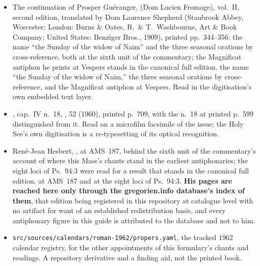 \begin{itemize}
\& Washbourne, 1927), printed pp.~139--141,
\ifdefined\TriptychSynthesisEdition
for the Lawrence reckoning at the sixth unit of the commentary and the Lenten
identities of the Gradual, the Offertory and the Communion in the
source-grounded synthesis; that his three pages name no station church stands
in the canonical full edition.%
\else
for the Lawrence reckoning, the
Lenten identities of the Gradual, the Offertory and the Communion, and the
absence of a station.%
\fi{}
Read on page images of the registered scan.
\item The continuation of Prosper Guéranger,  (Dom Lucien Fromage), vol.~II, second edition, translated by Dom Laurence Shepherd (Stanbrook Abbey,
Worcester; London: Burns \& Oates, R.\ \& T.\ Washbourne, Art \& Book Company;
United States: Benziger Bros., 1909), printed pp.~344--356:
\ifdefined\TriptychSynthesisEdition
the name ``the Sunday of the widow of Naim'' and the three seasonal orations by
cross-reference, both at the sixth unit of the commentary; the Magnificat
antiphon he prints at Vespers stands in the canonical full edition.%
\else
the name ``the
Sunday of the widow of Naim,'' the three seasonal orations by cross-reference,
and the Magnificat antiphon at Vespers.%
\fi{}
Read in the digitisation's own embedded
text layer.
\item {}, cap.~IV n.~18,
,  52 (1960), printed p.~709, with the  n.~18 at
printed p.~599 distinguished from it. Read on a microfilm facsimile of the issue;
the Holy See's own digitisation is a re-typesetting of its optical recognition.
\item René-Jean Hesbert, ,
\ifdefined\TriptychSynthesisEdition
at AMS~187, behind the sixth unit of the commentary's account of where this
Mass's chants stand in the earliest antiphonaries; the eight loci of Ps.\ 94:3
were read for a result that stands in the canonical full edition.%
\else
at AMS~187 and at
the eight loci of Ps.\ 94:3.%
\fi{}
\textbf{His pages are reached here only through the
gregorien.info database's index of them}, that edition being registered in this
repository at catalogue level with no artifact for want of an established
redistribution basis, and every antiphonary figure in this guide is attributed to
the database and not to him.
\item \texttt{src/sources/calendars/roman-1962/propers.yaml}, the tracked 1962
calendar registry, for the other appointments of this formulary's chants and
readings. A repository derivative and a finding aid, not the printed book.
\end{itemize}

